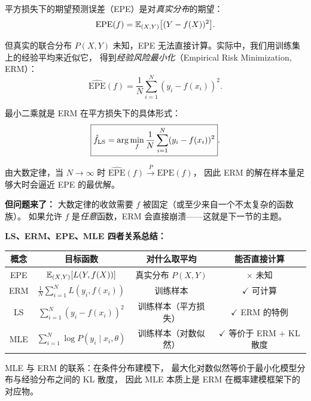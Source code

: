 平方损失下的期望预测误差（EPE）是对\emph{真实分布}的期望：
\begin{equation}
    \mathrm{EPE}(f) = \mathbb{E}_{(X,Y)}\big[(Y - f(X))^2\big].
\end{equation}

但真实的联合分布 $P(X,Y)$ 未知，EPE 无法直接计算。实际中，我们用训练集上的经验平均来近似它，
得到\emph{经验风险最小化}（Empirical Risk Minimization, ERM）：
\begin{equation}
    \widehat{\mathrm{EPE}}(f) = \frac{1}{N}\sum_{i=1}^{N} (y_i - f(x_i))^2.
\end{equation}

最小二乘就是 ERM 在平方损失下的具体形式：
\begin{equation}
    \boxed{\hat{f}_{\mathrm{LS}} = \arg\min_{f} \frac{1}{N}\sum_{i=1}^{N} (y_i - f(x_i))^2}.
\end{equation}

由大数定律，当 $N \to \infty$ 时 $\widehat{\mathrm{EPE}}(f) \xrightarrow{P} \mathrm{EPE}(f)$，
因此 ERM 的解在样本量足够大时会逼近 EPE 的最优解。

\textbf{但问题来了：} 大数定律的收敛需要 $f$ 被固定（或至少来自一个不太复杂的函数族）。
如果允许 $f$ 是\emph{任意}函数，ERM 会直接崩溃——这就是下一节的主题。

\medskip
\textbf{LS、ERM、EPE、MLE 四者关系总结：}

\begin{center}
\renewcommand{\arraystretch}{1.5}
\begin{tabular}{c|c|c|c}
\toprule
\textbf{概念} & \textbf{目标函数} & \textbf{对什么取平均} & \textbf{能否直接计算} \\
\midrule
EPE  & $\mathbb{E}_{(X,Y)}[L(Y, f(X))]$ & 真实分布 $P(X,Y)$ & $\times$ 未知 \\
ERM  & $\frac{1}{N}\sum_{i=1}^N L(y_i, f(x_i))$ & 训练样本 & $\checkmark$ 可计算 \\
LS   & $\sum_{i=1}^N (y_i - f(x_i))^2$ & 训练样本（平方损失） & $\checkmark$ ERM 的特例 \\
MLE  & $\sum_{i=1}^N \log P(y_i \mid x_i, \theta)$ & 训练样本（对数似然） & $\checkmark$ 等价于 ERM + KL 散度 \\
\bottomrule
\end{tabular}
\end{center}

MLE 与 ERM 的联系：在条件分布建模下，
最大化对数似然等价于最小化模型分布与经验分布之间的 KL 散度，
因此 MLE 本质上是 ERM 在概率建模框架下的对应物。

